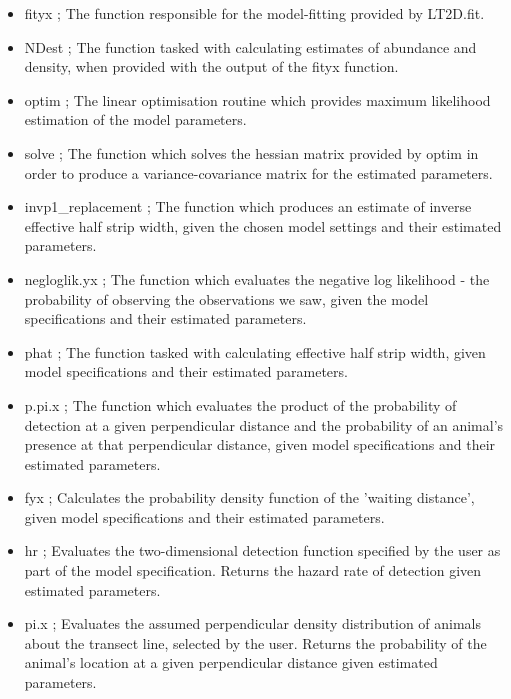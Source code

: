 \documentclass[11pt]{article}
\begin{document}
\begin{multicols}{2}
\begin{itemize}
\item fityx ; The function responsible for the model-fitting provided by LT2D.fit.

\item NDest ; The function tasked with calculating estimates of abundance and density, when provided with the output of the fityx function.

\item optim ; The linear optimisation routine which provides maximum likelihood estimation of the model parameters.

\item solve ; The function which solves the hessian matrix provided by optim in order to produce a variance-covariance matrix for the estimated parameters.

\item invp1\_replacement ; The function which produces an estimate of inverse effective half strip width, given the chosen model settings and their estimated parameters.

\item negloglik.yx ; The function which evaluates the negative log likelihood - the probability of observing the observations we saw, given the model specifications and their estimated parameters.

\item phat ; The function tasked with calculating effective half strip width, given model specifications and their estimated parameters.

\item p.pi.x ; The function which evaluates the product of the probability of detection at a given perpendicular distance and the probability of an animal's presence at that perpendicular distance, given model specifications and their estimated parameters.

\item fyx ; Calculates the probability density function of the 'waiting distance', given model specifications and their estimated parameters.

\item hr ; Evaluates the two-dimensional detection function specified by the user as part of the model specification. Returns the hazard rate of detection given estimated parameters.

\item pi.x ; Evaluates the assumed perpendicular density distribution of animals about the transect line, selected by the user. Returns the probability of the animal's location at a given perpendicular distance given estimated parameters.


\end{itemize}
\end{multicols}
\end{document}
